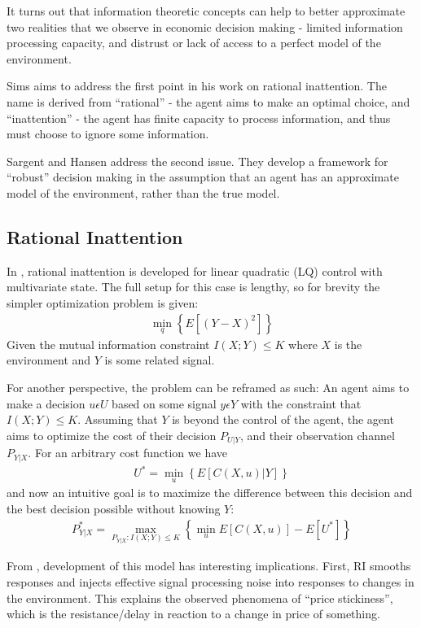 \documentclass[10pt, twocolumn]{IEEEtran}
\begin{document}
It turns out that information theoretic concepts can help to better approximate two realities that
we observe in economic decision making - limited information processing capacity, and distrust or
lack of access to a perfect model of the environment.

Sims \cite{Sims2003} \cite{Sims2010} aims to address the first point in his work on rational inattention.
The name is derived from ``rational'' - the agent aims to make an optimal choice, and ``inattention'' -
the agent has finite capacity to process information, and thus must choose to ignore some information.

Sargent and Hansen \cite{robustness} \cite{Hansen2010} address the second issue. They develop a framework
for ``robust'' decision making in the assumption that an agent has an approximate model of the environment,
rather than the true model.

\subsection{Rational Inattention}
In \cite{Sims2003}, rational inattention is developed for linear quadratic (LQ) control with multivariate
state. The full setup for this case is lengthy, so for brevity the simpler optimization problem is given:
\begin{gather*}
  \min_{q}\left\{E\left[(Y-X)^{2}\right]\right\}
\end{gather*}
Given the mutual information constraint $I(X;Y) \le K$ where $X$
is the environment and $Y$ is some related signal.

For another perspective, the problem can be reframed as such:
An agent aims to make a decision $u \epsilon U$ based on some signal $y \epsilon Y$ with the constraint that
$I(X;Y) \le K$. Assuming that $Y$ is beyond the control of the agent, the agent aims to optimize the cost of
their decision $P_{U|Y}$, and their observation channel $P_{Y|X}$. For an arbitrary cost function we have
\begin{gather*}
  U^{*} = \min_{u}\left\{E\left[C(X, u)|Y\right]\right\}
\end{gather*}
and now an intuitive goal is to maximize the difference between this decision and the best decision possible
without knowing $Y$:
\begin{gather*}
  P_{Y|X}^{*} = \max_{P_{Y|X} : I(X;Y) \le K}\left\{\min_{u}E\left[C(X, u)\right] - E\left[U^{*}\right]\right\}
\end{gather*}

From \cite{Sims2010}, development of this model has interesting implications. First, RI smooths responses
and injects effective signal processing noise into responses to changes in the environment. This explains
the observed phenomena of ``price stickiness'', which is the resistance/delay in reaction to a change in
price of something.
\end{document}
